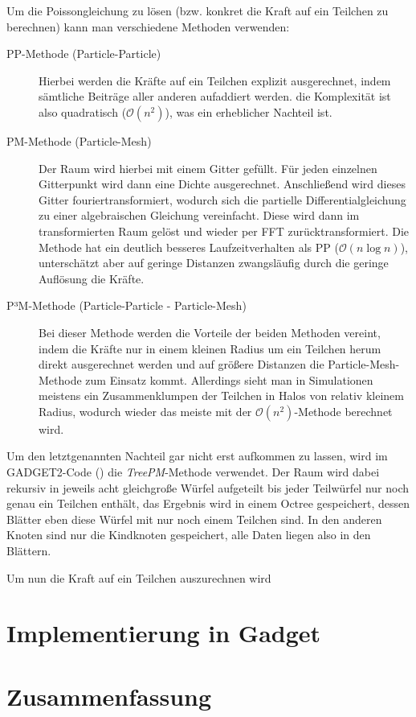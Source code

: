 \documentclass[a4paper]{scrartcl}
\begin{document}
Um die Poissongleichung zu lösen (bzw. konkret die Kraft auf ein Teilchen zu
berechnen) kann man verschiedene Methoden verwenden:
\begin{description}
  \item[PP-Methode (Particle-Particle)]
    Hierbei werden die Kräfte auf ein Teilchen explizit ausgerechnet, indem
    sämtliche Beiträge aller anderen aufaddiert werden. die Komplexität ist also
    quadratisch ($\mathcal O(n^2)$), was ein erheblicher Nachteil ist.
  \item[PM-Methode (Particle-Mesh)]
    Der Raum wird hierbei mit einem Gitter gefüllt. Für jeden einzelnen
    Gitterpunkt wird dann eine Dichte ausgerechnet. Anschließend wird dieses
    Gitter fouriertransformiert, wodurch sich die partielle
    Differentialgleichung zu einer algebraischen Gleichung vereinfacht. Diese
    wird dann im transformierten Raum gelöst und wieder per FFT
    zurücktransformiert. Die Methode hat ein deutlich besseres Laufzeitverhalten
    als PP ($\mathcal O(n\log n)$), unterschätzt aber auf geringe Distanzen
    zwangsläufig durch die geringe Auflösung die Kräfte.
  \item[P³M-Methode (Particle-Particle - Particle-Mesh)]
    Bei dieser Methode werden die Vorteile der beiden Methoden vereint, indem
    die Kräfte nur in einem kleinen Radius um ein Teilchen herum direkt
    ausgerechnet werden und auf größere Distanzen die Particle-Mesh-Methode zum
    Einsatz kommt. Allerdings sieht man in Simulationen meistens ein
    Zusammenklumpen der Teilchen in Halos von relativ kleinem Radius, wodurch
    wieder das meiste mit der $\mathcal O (n^2)$-Methode berechnet wird.
\end{description}

Um den letztgenannten Nachteil gar nicht erst aufkommen zu lassen, wird im
GADGET2-Code (\cite{}) die \emph{TreePM}-Methode verwendet. Der Raum wird dabei
rekursiv in jeweils acht gleichgroße Würfel aufgeteilt bis jeder Teilwürfel nur
noch genau ein Teilchen enthält, das Ergebnis wird in einem Octree gespeichert,
dessen Blätter eben diese Würfel mit nur noch einem Teilchen sind. In den
anderen Knoten sind nur die Kindknoten gespeichert, alle Daten liegen also in
den Blättern.

Um nun die Kraft auf ein Teilchen auszurechnen wird 

\section{Implementierung in Gadget}


\section{Zusammenfassung}

\end{document}
